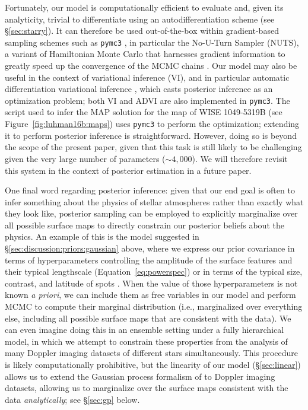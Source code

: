 \documentclass[modern]{aastex631}
\begin{document}
Fortunately, our model is computationally efficient to evaluate and, given its analyticity, trivial to differentiate using an autodifferentiation scheme (see \S\ref{sec:starry}).
It can therefore be used out-of-the-box within gradient-based sampling schemes such as \texttt{pymc3} \citep{Salvatier2016}, in particular the No-U-Turn Sampler (NUTS), a variant of Hamiltonian Monte Carlo that harnesses gradient information to greatly speed up the convergence of the MCMC chains \citep[for a recent application of HMC in the context of spectroscopy, see][]{Kawahara2021}.
Our model may also be useful in the context of variational inference (VI), and in particular automatic differentiation variational inference \citep[ADVI;][]{Kucukelbir2016}, which casts posterior inference as an optimization problem; both VI and ADVI are also implemented in \texttt{pymc3}.
The script used to infer the MAP solution for the map of WISE 1049-5319B (see Figure~\ref{fig:luhman16b:maps}) uses \texttt{pymc3} to perform the optimization; extending it to perform posterior inference is straightforward.
However, doing so is beyond the scope of the present paper, given that this task is still likely to be challenging given the very large number of parameters (${\sim}4{,}000$). 
We will therefore revisit this system in the context of posterior estimation in a future paper.

One final word regarding posterior inference: given that our end goal is often to infer something about the physics of stellar atmospheres rather than exactly what they look like, posterior sampling can be employed to explicitly marginalize over all possible surface maps to directly constrain our posterior beliefs about the physics.
An example of this is the model suggested in \S\ref{sec:discussion:priors:gaussian} above, where we express our prior covariance in terms of hyperparameters controlling the amplitude of the surface features and their typical lengthscale (Equation~\ref{eq:powerspec}) or in terms of the typical size, contrast, and latitude of spots \citep{Luger2021b,Luger2021d}.
When the value of those hyperparameters is not known \emph{a priori}, we can include them as free variables in our model and perform MCMC to compute their marginal distribution (i.e., marginalized over everything else, including all possible surface maps that are consistent with the data).
We can even imagine doing this in an ensemble setting under a fully hierarchical model, in which we attempt to constrain these properties from the analysis of many Doppler imaging datasets of different stars simultaneously.
This procedure is likely computationally prohibitive, but the linearity of our model (\S\ref{sec:linear}) allows us to extend the Gaussian process formalism of \citet{Luger2021b} to Doppler imaging datasets, allowing us to marginalize over the surface maps consistent with the data \emph{analytically}; see \S\ref{sec:gp} below.
\end{document}
